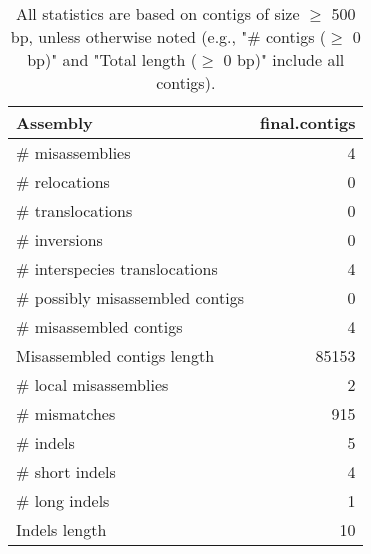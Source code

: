 \documentclass[12pt,a4paper]{article}
\begin{document}
\begin{table}[ht]
\begin{center}
\caption{All statistics are based on contigs of size $\geq$ 500 bp, unless otherwise noted (e.g., "\# contigs ($\geq$ 0 bp)" and "Total length ($\geq$ 0 bp)" include all contigs).}
\begin{tabular}{|l*{1}{|r}|}
\hline
Assembly & final.contigs \\ \hline
\# misassemblies & 4 \\ \hline
\hspace{5mm}\# relocations & 0 \\ \hline
\hspace{5mm}\# translocations & 0 \\ \hline
\hspace{5mm}\# inversions & 0 \\ \hline
\hspace{5mm}\# interspecies translocations & 4 \\ \hline
\# possibly misassembled contigs & 0 \\ \hline
\# misassembled contigs & 4 \\ \hline
Misassembled contigs length & 85153 \\ \hline
\# local misassemblies & 2 \\ \hline
\# mismatches & 915 \\ \hline
\# indels & 5 \\ \hline
\hspace{5mm}\# short indels & 4 \\ \hline
\hspace{5mm}\# long indels & 1 \\ \hline
Indels length & 10 \\ \hline
\end{tabular}
\end{center}
\end{table}
\end{document}
